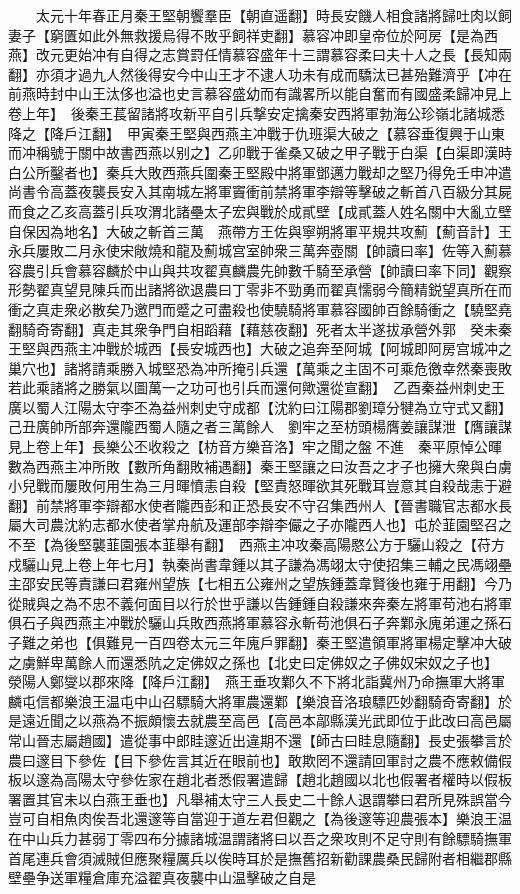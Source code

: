 　　太元十年春正月秦王堅朝饗羣臣【朝直遥翻】時長安饑人相食諸將歸吐肉以飼妻子【窮匱如此外無救援烏得不敗乎飼祥吏翻】慕容冲即皇帝位於阿房【是為西燕】改元更始冲有自得之志賞罸任情慕容盛年十三謂慕容柔曰夫十人之長【長知兩翻】亦須才過九人然後得安今中山王才不逮人功未有成而驕汰已甚殆難濟乎【冲在前燕時封中山王汰侈也溢也史言慕容盛幼而有識畧所以能自奮而有國盛柔歸冲見上卷上年】　後秦王萇留諸將攻新平自引兵撃安定擒秦安西將軍勃海公珍嶺北諸城悉降之【降戶江翻】　甲寅秦王堅與西燕主冲戰于仇班渠大破之【慕容垂復興于山東而冲稱號于關中故書西燕以别之】乙卯戰于雀桑又破之甲子戰于白渠【白渠即漢時白公所鑿者也】秦兵大敗西燕兵圍秦王堅殿中將軍鄧邁力戰却之堅乃得免壬申冲遣尚書令高蓋夜襲長安入其南城左將軍竇衝前禁將軍李辯等擊破之斬首八百級分其屍而食之乙亥高蓋引兵攻渭北諸壘太子宏與戰於成貳壁【成貳蓋人姓名關中大亂立壁自保因為地名】大破之斬首三萬　燕帶方王佐與寧朔將軍平規共攻薊【薊音計】王永兵屢敗二月永使宋敞燒和龍及薊城宫室帥衆三萬奔壺關【帥讀曰率】佐等入薊慕容農引兵會慕容麟於中山與共攻翟真麟農先帥數千騎至承營【帥讀曰率下同】觀察形勢翟真望見陳兵而出諸將欲退農曰丁零非不勁勇而翟真懦弱今簡精鋭望真所在而衝之真走衆必散矣乃邀門而蹙之可盡殺也使驍騎將軍慕容國帥百餘騎衝之【驍堅堯翻騎奇寄翻】真走其衆争門自相蹈藉【藉慈夜翻】死者太半遂拔承營外郭　癸未秦王堅與西燕主冲戰於城西【長安城西也】大破之追奔至阿城【阿城即阿房宫城冲之巢穴也】諸將請乘勝入城堅恐為冲所掩引兵還【萬乘之主固不可乘危徼幸然秦喪敗若此乘諸將之勝氣以圖萬一之功可也引兵而還何歟還從宣翻】　乙酉秦益州刺史王廣以蜀人江陽太守李丕為益州刺史守成都【沈約曰江陽郡劉璋分犍為立守式又翻】己丑廣帥所部奔還隴西蜀人隨之者三萬餘人　劉牢之至枋頭楊膺姜讓謀泄【膺讓謀見上卷上年】長樂公丕收殺之【枋音方樂音洛】牢之聞之盤不進　秦平原悼公暉數為西燕主冲所敗【數所角翻敗補遇翻】秦王堅讓之曰汝吾之才子也擁大衆與白虜小兒戰而屢敗何用生為三月暉憤恚自殺【堅責怒暉欲其死戰耳豈意其自殺哉恚于避翻】前禁將軍李辯都水使者隴西彭和正恐長安不守召集西州人【晉書職官志都水長屬大司農沈約志都水使者掌舟航及運部李辯李儼之子亦隴西人也】屯於韮園堅召之不至【為後堅襲韮園張本韮舉有翻】　西燕主冲攻秦高陽愍公方于驪山殺之【苻方戍驪山見上卷上年七月】執秦尚書韋鍾以其子謙為馮翊太守使招集三輔之民馮翊壘主邵安民等責謙曰君雍州望族【七相五公雍州之望族鍾蓋韋賢後也雍于用翻】今乃從賊與之為不忠不義何面目以行於世乎謙以告鍾鍾自殺謙來奔秦左將軍苟池右將軍俱石子與西燕主冲戰於驪山兵敗西燕將軍慕容永斬苟池俱石子奔鄴永廆弟運之孫石子難之弟也【俱難見一百四卷太元三年廆戶罪翻】秦王堅遣領軍將軍楊定擊冲大破之虜鮮卑萬餘人而還悉阬之定佛奴之孫也【北史曰定佛奴之子佛奴宋奴之子也】　滎陽人鄭燮以郡來降【降戶江翻】　燕王垂攻鄴久不下將北詣冀州乃命撫軍大將軍麟屯信都樂浪王温屯中山召驃騎大將軍農還鄴【樂浪音洛琅驃匹妙翻騎奇寄翻】於是遠近聞之以燕為不振頗懷去就農至高邑【高邑本鄗縣漢光武即位于此改曰高邑屬常山晉志屬趙國】遣從事中郎眭邃近出違期不還【師古曰眭息隨翻】長史張攀言於農曰邃目下參佐【目下參佐言其近在眼前也】敢欺罔不還請回軍討之農不應敕備假板以邃為高陽太守參佐家在趙北者悉假署遣歸【趙北趙國以北也假署者權時以假板署置其官未以白燕王垂也】凡舉補太守三人長史二十餘人退謂攀曰君所見殊誤當今豈可自相魚肉俟吾北還邃等自當迎于道左君但觀之【為後邃等迎農張本】樂浪王温在中山兵力甚弱丁零四布分據諸城温謂諸將曰以吾之衆攻則不足守則有餘驃騎撫軍首尾連兵會須滅賊但應聚糧厲兵以俟時耳於是撫舊招新勸課農桑民歸附者相繼郡縣壁壘争送軍糧倉庫充溢翟真夜襲中山温擊破之自是